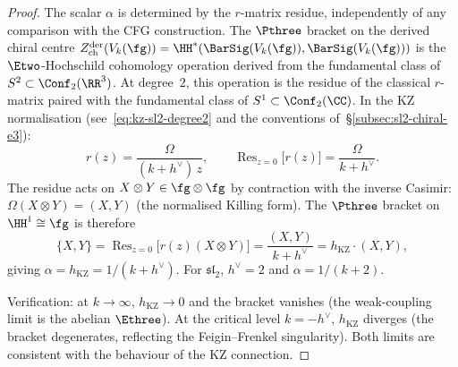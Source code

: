 \begin{proof}
The scalar $\alpha$ is determined by the $r$-matrix
residue, independently of any comparison with the CFG
construction. The $\Pthree$ bracket on the derived
chiral centre $Z^{\mathrm{der}}_{\mathrm{ch}}(V_k(\fg))
= \HH^*(\BarSig(V_k(\fg)), \BarSig(V_k(\fg)))$ is the
$\Etwo$-Hochschild cohomology operation derived from
the fundamental class of $S^2 \subset \Conf_2(\RR^3)$.
At degree~$2$, this operation is the residue of the
classical $r$-matrix paired with the fundamental class
of $S^1 \subset \Conf_2(\CC)$. In the KZ normalisation
(see~\eqref{eq:kz-sl2-degree2} and the conventions
of~\S\ref{subsec:sl2-chiral-e3}):
\begin{equation}\label{eq:p3-from-r-matrix-residue}
  r(z) = \frac{\Omega}{(k + h^\vee)\,z},
  \qquad
  \operatorname{Res}_{z=0}\bigl[r(z)\bigr]
  = \frac{\Omega}{k + h^\vee}.
\end{equation}
The residue acts on $X \otimes Y \in \fg \otimes \fg$
by contraction with the inverse Casimir:
$\Omega(X \otimes Y) = (X, Y)$ (the normalised Killing
form). The $\Pthree$ bracket on $\HH^1 \cong \fg$ is
therefore
\begin{equation}\label{eq:p3-bracket-normalisation}
  \{X, Y\}
  = \operatorname{Res}_{z=0}
  \bigl[r(z)(X \otimes Y)\bigr]
  = \frac{(X, Y)}{k + h^\vee}
  = h_{\mathrm{KZ}} \cdot (X, Y),
\end{equation}
giving $\alpha = h_{\mathrm{KZ}} = 1/(k + h^\vee)$.
For $\mathfrak{sl}_2$, $h^\vee = 2$ and
$\alpha = 1/(k + 2)$.

Verification: at $k \to \infty$,
$h_{\mathrm{KZ}} \to 0$ and the bracket vanishes (the
weak-coupling limit is the abelian $\Ethree$). At the
critical level $k = -h^\vee$, $h_{\mathrm{KZ}}$ diverges
(the bracket degenerates, reflecting the Feigin--Frenkel
singularity). Both limits are consistent with
the behaviour of the KZ connection.


\end{proof}
